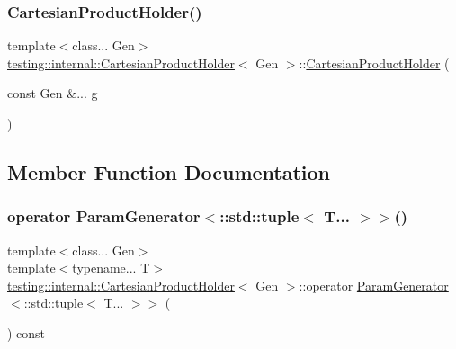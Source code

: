 \subsubsection{\texorpdfstring{Cartesian\+Product\+Holder()}{CartesianProductHolder()}}
{\footnotesize\ttfamily template$<$class... Gen$>$ \\
\hyperlink{classtesting_1_1internal_1_1CartesianProductHolder}{testing\+::internal\+::\+Cartesian\+Product\+Holder}$<$ Gen $>$\+::\hyperlink{classtesting_1_1internal_1_1CartesianProductHolder}{Cartesian\+Product\+Holder} (\begin{DoxyParamCaption}\item[{const Gen \&...}]{g }\end{DoxyParamCaption})\hspace{0.3cm}{\ttfamily [inline]}}



\subsection{Member Function Documentation}
\mbox{\label{classtesting_1_1internal_1_1CartesianProductHolder_ab29313123e08f3fc7111eac6e80351a5}} 
\subsubsection{\texorpdfstring{operator Param\+Generator$<$\+::std\+::tuple$<$ T... $>$$>$()}{operator ParamGenerator<::std::tuple< T... >>()}}
{\footnotesize\ttfamily template$<$class... Gen$>$ \\
template$<$typename... T$>$ \\
\hyperlink{classtesting_1_1internal_1_1CartesianProductHolder}{testing\+::internal\+::\+Cartesian\+Product\+Holder}$<$ Gen $>$\+::operator \hyperlink{classtesting_1_1internal_1_1ParamGenerator}{Param\+Generator}$<$\+::std\+::tuple$<$ T... $>$$>$ (\begin{DoxyParamCaption}{ }\end{DoxyParamCaption}) const\hspace{0.3cm}{\ttfamily [inline]}}



